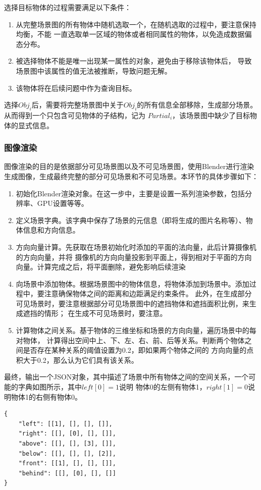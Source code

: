 \begin{enumerate}[nosep]
选择目标物体的过程需要满足以下条件：
\begin{enumerate}[nosep]
\item 从完整场景图的所有物体中随机选取一个，在随机选取的过程中，要注意保持均衡，不能
一直选取单一区域的物体或者相同属性的物体，以免造成数据偏态分布。
\item 被选择物体不能是唯一出现某一属性的对象，避免由于移除该物体后，
导致场景图中该属性的值无法被推断，导致问题无解。
\item 该物体将在后续问题中作为查询目标。
\end{enumerate}

选择$Obj_i$后，需要将完整场景图中关于$Obj_i$的所有信息全部移除，生成部分场景。
从而得到一个只包含可见物体的子结构，记为 $Partial_i$，该场景图中缺少了目标物体的显式信息。
\end{enumerate}
\subsubsection{图像渲染}
图像渲染的目的是依据部分可见场景图以及不可见场景图，使用Blender进行渲染生成图像，生成最终完整的部分可见场景和不可见场景。本环节的具体步骤如下：
\begin{enumerate}[nosep]
\item 初始化Blender渲染对象。在这一步中，主要是设置一系列渲染参数，包括分辨率、GPU设置等等。
\item 定义场景字典。该字典中保存了场景的元信息（即将生成的图片名称等）、物体信息和方向信息。
\item 方向向量计算。先获取在场景初始化时添加的平面的法向量，此后计算摄像机的方向向量，并将
摄像机的方向向量投影到平面上，得到相对于平面的方向向量。计算完成之后，将平面删除，避免影响后续渲染
\item 向场景中添加物体。根据场景图中的物体信息，将物体添加到场景中。添加过程中，要注意确保物体之间的距离和边距满足约束条件。
此外，在生成部分可见场景时，要注意根据部分可见场景图中的遮挡物体和遮挡面积比例，来生成遮挡的情形；
在生成不可见场景时，要注意。
\item 计算物体之间关系。基于物体的三维坐标和场景的方向向量，遍历场景中的每对物体，
计算得出空间中上、下、左、右、前、后等关系。判断两个物体之间是否存在某种关系的阈值设置为0.2，即如果两个物体之间的
方向向量的点积大于0.2，那么认为它们具有该关系。
\end{enumerate}
最终，输出一个JSON对象，其中描述了场景中所有物体之间的空间关系，一个可能的字典如图所示，其中$left[0] = 1$说明
物体0的左侧有物体1，$right[1] = 0$说明物体1的右侧有物体0。
\begin{lstlisting}
{
    "left": [[1], [], [], []],
    "right": [[], [0], [], []],
    "above": [[], [], [3], []],
    "below": [[], [], [], [2]],
    "front": [[1], [], [], []],
    "behind": [[], [0], [], []]
}
\end{lstlisting}

